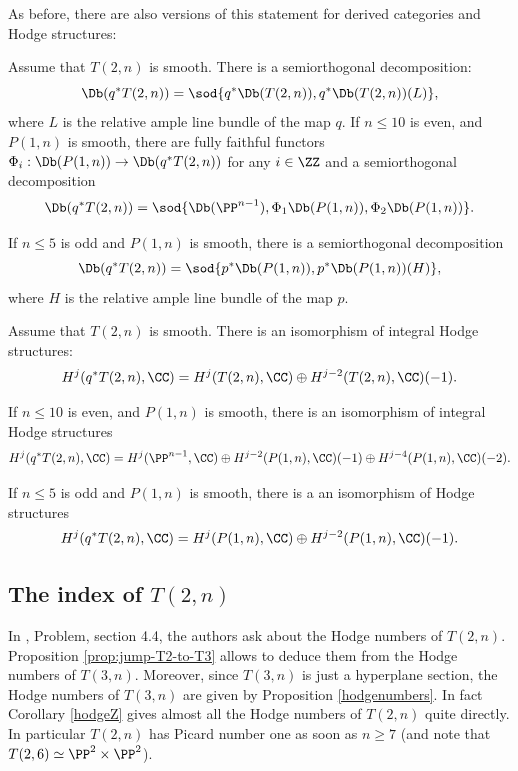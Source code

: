 As before, there are also versions of this statement for derived categories and Hodge structures:

\begin{prop}\label{prop:decoforpeski}
Assume that $T(2,n)$ is smooth.
There is a semiorthogonal decomposition:
\begin{equation*}
\Db(q^*T(2,n))=\sod{q^* \Db(T(2,n)),q^*\Db(T(2,n))(L)},
\end{equation*}
where $L$ is the relative ample line bundle of the map $q$.
If $n\le 10$ is even, and $P(1,n)$ is smooth, there are fully faithful functors $\Phi_i:\Db(P(1,n)) \to \Db(q^*T(2,n))$ for any $i \in \ZZ$ and a semiorthogonal decomposition
\begin{equation*}
\Db(q^*T(2,n))=\sod{\Db(\PP^{n-1}),\Phi_1\Db(P(1,n)),\Phi_2\Db(P(1,n))}.
\end{equation*}

If $n\le 5$ is odd and $P(1,n)$ is smooth, there is a semiorthogonal decomposition
\begin{equation*}
\Db(q^*T(2,n))=\sod{p^*\Db(P(1,n)),p^*\Db(P(1,n))(H)},
\end{equation*}
where $H$ is the relative ample line bundle of the map $p$.
\end{prop}

\begin{prop}\label{prop:peski-Hodge}
Assume that $T(2,n)$ is smooth.
There is an isomorphism of integral Hodge structures:
\begin{equation*}
H^j(q^*T(2,n),\CC)= H^j(T(2,n),\CC) \oplus H^{j-2}(T(2,n),\CC)(-1).
\end{equation*}

If $n\le 10$ is even, and $P(1,n)$ is smooth, there is an isomorphism of integral Hodge structures
\[
H^j(q^*T(2,n),\CC)=H^j(\PP^{n-1},\CC) \oplus H^{j-2}(P(1,n),\CC)(-1) \oplus H^{j-4}(P(1,n),\CC)(-2).
\]

If $n\le 5$ is odd and $P(1,n)$ is smooth, there is a an isomorphism of Hodge structures%
\begin{equation*}
H^j(q^*T(2,n),\CC)=H^j(P(1,n),\CC) \oplus H^{j-2}(P(1,n),\CC)(-1).
\end{equation*}
\end{prop}

\subsection{The index of $T(2,n)$}

In \cite{dpfmr}, Problem, section 4.4, the authors ask about the Hodge numbers of $T(2,n)$.
Proposition \ref{prop:jump-T2-to-T3} allows to deduce them from the Hodge numbers of $T(3,n)$.
Moreover, since $T(3,n)$ is just a hyperplane section, the Hodge numbers of $T(3,n)$ are given
by Proposition \ref{hodgenumbers}. In fact Corollary \ref{hodgeZ} gives almost all the Hodge
numbers of $T(2,n)$ quite directly.
In particular $T(2,n)$ has Picard number one as soon as $n\ge 7$ (and note that $T(2,6)\simeq
\PP^2\times\PP^2$).

